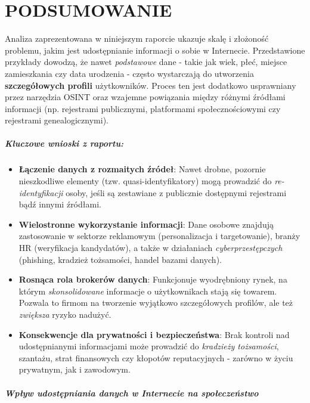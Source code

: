 \chapter{PODSUMOWANIE}

\noindent
Analiza zaprezentowana w niniejszym raporcie ukazuje skalę i złożoność problemu, jakim jest udostępnianie informacji o sobie w Internecie. Przedstawione przykłady dowodzą, że nawet \emph{podstawowe} dane - takie jak wiek, płeć, miejsce zamieszkania czy data urodzenia - często wystarczają do utworzenia \textbf{szczegółowych profili} użytkowników. Proces ten jest dodatkowo usprawniany przez narzędzia OSINT oraz wzajemne powiązania między różnymi źródłami informacji (np. rejestrami publicznymi, platformami społecznościowymi czy rejestrami genealogicznymi).

\paragraph{Kluczowe wnioski z raportu:}
\begin{itemize}
\item \textbf{Łączenie danych z rozmaitych źródeł}: Nawet drobne, pozornie nieszkodliwe elementy (tzw. quasi-identyfikatory) mogą prowadzić do \emph{re-identyfikacji} osoby, jeśli są zestawiane z publicznie dostępnymi rejestrami bądź innymi źródłami.
\item \textbf{Wielostronne wykorzystanie informacji}: Dane osobowe znajdują zastosowanie w sektorze reklamowym (personalizacja i targetowanie), branży HR (weryfikacja kandydatów), a także w działaniach \emph{cyberprzestępczych} (phishing, kradzież tożsamości, handel bazami danych).
\item \textbf{Rosnąca rola brokerów danych}: Funkcjonuje wyodrębniony rynek, na którym \emph{skonsolidowane} informacje o użytkownikach stają się towarem. Pozwala to firmom na tworzenie wyjątkowo szczegółowych profilów, ale też \emph{zwiększa} ryzyko nadużyć.
\item \textbf{Konsekwencje dla prywatności i bezpieczeństwa}: Brak kontroli nad udostępnianymi informacjami może prowadzić do \emph{kradzieży tożsamości}, szantażu, strat finansowych czy kłopotów reputacyjnych - zarówno w życiu prywatnym, jak i zawodowym.
\end{itemize}

\paragraph{Wpływ udostępniania danych w Internecie na społeczeństwo}
